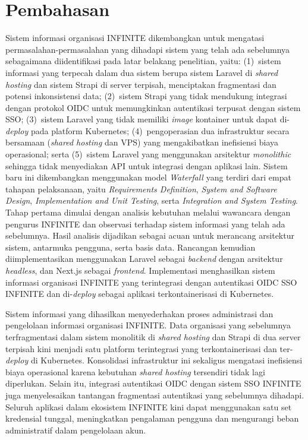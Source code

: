 \section{Pembahasan}

Sistem informasi organisasi INFINITE dikembangkan untuk mengatasi permasalahan-permasalahan yang dihadapi sistem yang telah ada sebelumnya sebagaimana diidentifikasi pada latar belakang penelitian, yaitu: (1)~sistem informasi yang terpecah dalam dua sistem berupa sistem Laravel di \textit{shared hosting} dan sistem Strapi di server terpisah, menciptakan fragmentasi dan potensi inkonsistensi data; (2)~sistem Strapi yang tidak mendukung integrasi dengan protokol OIDC untuk memungkinkan autentikasi terpusat dengan sistem SSO; (3)~sistem Laravel yang tidak memiliki \textit{image} kontainer untuk dapat di-\textit{deploy} pada platform Kubernetes; (4)~pengoperasian dua infrastruktur secara bersamaan (\textit{shared hosting} dan VPS) yang mengakibatkan inefisiensi biaya operasional; serta (5)~sistem Laravel yang menggunakan arsitektur \textit{monolithic} sehingga tidak menyediakan API untuk integrasi dengan aplikasi lain. Sistem baru ini dikembangkan menggunakan model \textit{Waterfall} yang terdiri dari empat tahapan pelaksanaan, yaitu \textit{Requirements Definition}, \textit{System and Software Design}, \textit{Implementation and Unit Testing}, serta \textit{Integration and System Testing}. Tahap pertama dimulai dengan analisis kebutuhan melalui wawancara dengan pengurus INFINITE dan observasi terhadap sistem informasi yang telah ada sebelumnya. Hasil analisis dijadikan sebagai acuan untuk merancang arsitektur sistem, antarmuka pengguna, serta basis data. Rancangan kemudian diimplementasikan menggunakan Laravel sebagai \textit{backend} dengan arsitektur \textit{headless}, dan Next.js sebagai \textit{frontend}. Implementasi menghasilkan sistem informasi organisasi INFINITE yang terintegrasi dengan autentikasi OIDC SSO INFINITE dan di-\textit{deploy} sebagai aplikasi terkontainerisasi di Kubernetes.

Sistem informasi yang dihasilkan menyederhakan proses administrasi dan pengelolaan informasi organisasi INFINITE. Data organisasi yang sebelumnya terfragmentasi dalam sistem monolitik di \textit{shared hosting} dan Strapi di dua server terpisah kini menjadi satu platform terintegrasi yang terkontainerisasi dan ter-\textit{deploy} di Kubernetes. Konsolidasi infrastruktur ini sekaligus mengatasi inefisiensi biaya operasional karena kebutuhan \textit{shared hosting} tersendiri tidak lagi diperlukan. Selain itu, integrasi autentikasi OIDC dengan sistem SSO INFINITE juga menyelesaikan tantangan fragmentasi autentikasi yang sebelumnya dihadapi. Seluruh aplikasi dalam ekosistem INFINITE kini dapat menggunakan satu set kredensial tunggal, meningkatkan pengalaman pengguna dan mengurangi beban administratif dalam pengelolaan akun.

